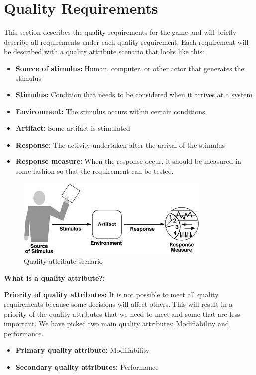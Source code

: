 \section{Quality Requirements}

This section describes the quality requirements for the game and will briefly describe all requirements under each quality requirement. Each requirement will be described with a quality attribute scenario that looks like this:

\begin{itemize}
	\item {\bf Source of stimulus:} Human, computer, or other actor that generates the stimulus
	\item {\bf Stimulus:} Condition that needs to be considered when it arrives at a system
	\item {\bf Environment:} The stimulus occurs within certain conditions
	\item {\bf Artifact:} Some artifact is stimulated 
	\item {\bf Response:} The activity undertaken after the arrival of the stimulus
	\item {\bf Response measure:} When the response occur, it should be measured in some fashion so that the requirement can be tested.
\end{itemize}

\begin{figure}[!hr]
	\includegraphics{pictures/qualityAttribute.jpg}
	\caption{Quality attribute scenario}
\end{figure}

{\bf What is a quality attribute?:}

{\bf Priority of quality attributes:} It is not possible to meet all quality requirements because some decisions will affect others. This will result in a priority of the quality attributes that we need to meet and some that are less important. We have picked two main quality attributes: Modifiability and performance.

\begin{itemize}
	\item {\bf Primary quality attribute: } Modifiability
	\item {\bf Secondary quality attributes: } Performance
\end{itemize}


